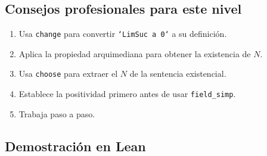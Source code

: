 \subsection{Consejos profesionales para este nivel}
\begin{enumerate}
    \item Usa \texttt{change} para convertir \texttt{`LimSuc a 0`} a su definición.
    \item Aplica la propiedad arquimediana para obtener la existencia de $N$.
    \item Usa \texttt{choose} para extraer el $N$ de la sentencia existencial.
    \item Establece la positividad primero antes de usar \texttt{field\_simp}.
    \item Trabaja paso a paso.
\end{enumerate}

\subsection{Demostración en Lean}

